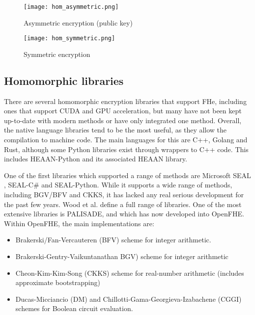 \documentclass[envcountsame,runningheads,notitlepage]{llncs}
\begin{document}
\begin{figure*}
\begin{center}
  \texttt{[image: hom\_asymmetric.png]}
  \caption{Asymmetric encryption (public key)}
  \label{fig:asym}
  \end{center}
\end{figure*}

\begin{figure*}
  \texttt{[image: hom\_symmetric.png]}
  \caption{Symmetric encryption}
  \label{fig:sym}
\end{figure*}

\subsection{Homomorphic libraries}
There are several homomorphic encryption libraries that support FHe, including ones that support CUDA and GPU acceleration, but many have not been kept up-to-date with modern methods or have only integrated one method. Overall, the native language libraries tend to be the most useful, as they allow the compilation to machine code. The main languages for this are C++, Golang and Rust, although some Python libraries exist through wrappers to C++ code. This includes HEAAN-Python and its associated HEAAN library.  

One of the first libraries which supported a range of methods are Microsoft SEAL \cite{asecuritysite_85691}, SEAL-C\# and SEAL-Python. While it supports a wide range of methods, including BGV/BFV and CKKS, it has lacked any real serious development for the past few years. Wood et al. \cite{wood2020homomorphic} define a full range of libraries. One of the most extensive libraries is PALISADE, and which has now developed into OpenFHE.  Within OpenFHE, the main implementations are:

\begin{itemize}
    \item Brakerski/Fan-Vercauteren (BFV) scheme for integer arithmetic.
    \item Brakerski-Gentry-Vaikuntanathan {BGV}) scheme for integer arithmetic
    \item Cheon-Kim-Kim-Song (CKKS) scheme for real-number arithmetic (includes approximate bootstrapping)
    \item Ducas-Micciancio (DM) and Chillotti-Gama-Georgieva-Izabachene (CGGI) schemes for Boolean circuit evaluation.
\end{itemize}
\end{document}
